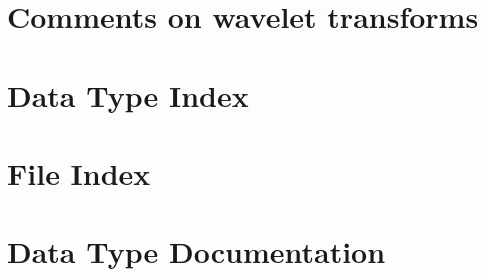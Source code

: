 \documentclass[twoside]{book}
\begin{document}
\chapter{Comments on wavelet transforms}
\label{Comments_01on_01wavelet_01transforms}
\hypertarget{Comments_01on_01wavelet_01transforms}{}

\chapter{Data Type Index}

\chapter{File Index}

\chapter{Data Type Documentation}




































\end{document}
